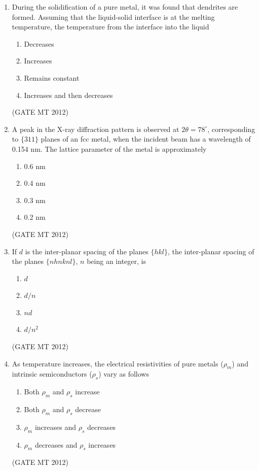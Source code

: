 \documentclass[journal, 11pt, onecolumn]{IEEEtran}
\theoremstyle{remark}
\begin{document}
\begin{enumerate}
\begin{enumerate}
\item During the solidification of a pure metal, it was found that dendrites are formed. Assuming that the liquid-solid interface is at the melting temperature, the temperature from the interface into the liquid  
\begin{multicols}{2}
\begin{enumerate}  
\item Decreases
\item Increases
\item Remains constant
\item Increases and then decreases
\end{enumerate}
\end{multicols}
\hfill(GATE MT 2012)
 

\item A peak in the X-ray diffraction pattern is observed at $2\theta = 78^\circ$, corresponding to $\{311\}$ planes of an fcc metal, when the incident beam has a wavelength of 0.154 nm. The lattice parameter of the metal is approximately  
\begin{multicols}{4}
\begin{enumerate}  
\item 0.6 nm
\item 0.4 nm
\item 0.3 nm
\item 0.2 nm
\end{enumerate}
\end{multicols}
\hfill(GATE MT 2012)
 

\item If $d$ is the inter-planar spacing of the planes $\{h k l\}$, the inter-planar spacing of the planes $\{n h n k n l\}$, $n$ being an integer, is  
\begin{multicols}{4}
\begin{enumerate}  
\item $d$
\item $d/n$
\item $nd$
\item $d/n^2$
\end{enumerate}
\end{multicols}
\hfill(GATE MT 2012)
 

\item As temperature increases, the electrical resistivities of pure metals ($\rho_m$) and intrinsic semiconductors ($\rho_s$) vary as follows  
\begin{multicols}{2}
\begin{enumerate}  
\item Both $\rho_m$ and $\rho_s$ increase
\item Both $\rho_m$ and $\rho_s$ decrease
\item $\rho_m$ increases and $\rho_s$ decreases
\item $\rho_m$ decreases and $\rho_s$ increases
\end{enumerate}
\end{multicols}
\hfill(GATE MT 2012)
 


\end{enumerate}
\end{enumerate}
\end{document}
